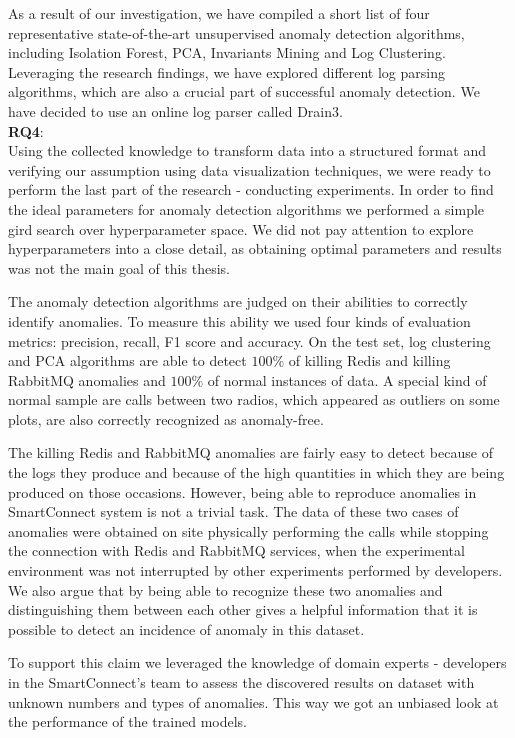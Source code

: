 As a result of our investigation, we have compiled a short list of four representative state-of-the-art unsupervised anomaly detection algorithms, including Isolation Forest, PCA, Invariants Mining and Log Clustering. Leveraging the research findings, we have explored different log parsing algorithms, which are also a crucial part of successful anomaly detection. We have decided to use an online log parser called Drain3.\\

\textbf{RQ4}: \textit{\RQFourth}\\

Using the collected knowledge to transform data into a structured format and verifying our assumption using data visualization techniques, we were ready to perform the last part of the research - conducting experiments. In order to find the ideal parameters for anomaly detection algorithms we performed a simple gird search over hyperparameter space. We did not pay attention to explore hyperparameters into a close detail, as obtaining optimal parameters and results was not the main goal of this thesis. 

The anomaly detection algorithms are judged on their abilities to correctly identify anomalies. To measure this ability we used four kinds of evaluation metrics: precision, recall, F1 score and accuracy. On the test set, log clustering and PCA algorithms are able to detect $100 \%$ of killing Redis and killing RabbitMQ anomalies and $100 \%$ of normal instances of data. A special kind of normal sample are calls between two radios, which appeared as outliers on some plots, are also correctly recognized as anomaly-free. 

The killing Redis and RabbitMQ anomalies are fairly easy to detect because of the logs they produce and because of the high quantities in which they are being produced on those occasions. However, being able to reproduce anomalies in SmartConnect system is not a trivial task. The data of these two cases of anomalies were obtained on site physically performing the calls while stopping the connection with Redis and RabbitMQ services, when the experimental environment was not interrupted by other experiments performed by developers. 
We also argue that by being able to recognize these two anomalies and distinguishing them between each other gives a helpful information that it is possible to detect an incidence of anomaly in this dataset. 

To support this claim we leveraged the knowledge of domain experts - developers in the SmartConnect's team to assess the discovered results on dataset with unknown numbers and types of anomalies. This way we got an unbiased look at the performance of the trained models.  